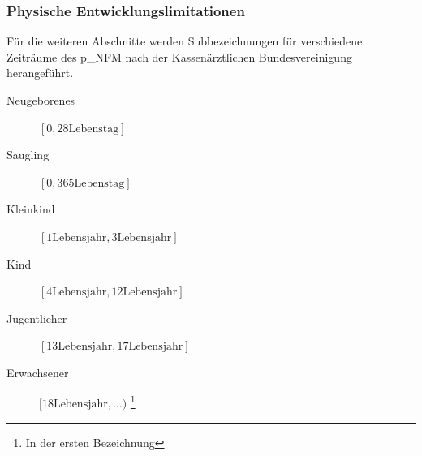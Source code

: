 \begin{itemize}
\subsubsection{Physische Entwicklungslimitationen}

Für die weiteren Abschnitte werden Subbezeichnungen für verschiedene Zeiträume des \gls{p_NFM} nach der Kassenärztlichen Bundesvereinigung herangeführt.
\begin{description}
	\item[Neugeborenes] $[0, 28 \text{Lebenstag}]$
	\item[Saugling] $[0,365 \text{Lebenstag}]$
	\item[Kleinkind] $[1 \text{Lebensjahr}, 3 \text{Lebensjahr}]$
	\item[Kind] $[4 \text{Lebensjahr}, 12 \text{Lebensjahr}]$
	\item[Jugentlicher] $[13 \text{Lebensjahr}, 17 \text{Lebensjahr}]$
	\item[Erwachsener] $[18 \text{Lebensjahr}, \dots )$ \footnote{In der ersten Bezeichnung}
\end{description} 



\end{itemize}
